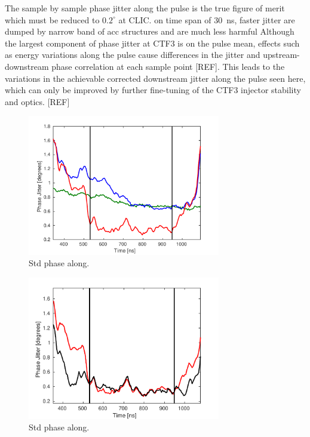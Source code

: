 The sample by sample phase jitter along the pulse is the true figure of merit which must be 
reduced to \(0.2^\circ\) at CLIC. 
{\color{red} on time span of 30~ns, faster jitter are dumped by narrow band of acc structures and are much less harmful}
Although the largest component of phase jitter at 
CTF3 is on the pulse mean, effects such as energy variations along the pulse cause 
differences in the jitter and upstream-downstream phase correlation at each sample point [REF]. 
This leads to the variations in the achievable corrected downstream jitter along 
the pulse seen here, which can only be improved by further fine-tuning of the CTF3 
injector stability and optics. [REF]

\begin{figure}
  \centering
  \includegraphics[width=0.75\textwidth]{Figures/feedforward/BestFF_StdPhaseAlong}
  \caption{Std phase along.}
  \label{f:BestFF_StdPhaseAlong}
\end{figure}

\begin{figure}
  \centering
  \includegraphics[width=0.75\textwidth]{Figures/feedforward/BestFF_SimStdAlongPulse}
  \caption{Std phase along.}
  \label{f:BestFF_SimStdPhaseAlong}
\end{figure}

